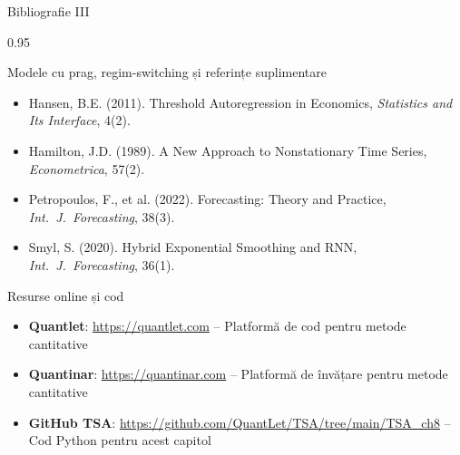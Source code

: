 \documentclass[9pt, aspectratio=169, t]{beamer}
\begin{document}
\begin{frame}{Bibliografie III}
    \begin{cminipage}{0.95\textwidth}
        \begin{block}{Modele cu prag, regim-switching și referințe suplimentare}
            {\footnotesize
            \begin{itemize}\setlength{\itemsep}{0pt}
                \item Hansen, B.E. (2011). Threshold Autoregression in Economics, \textit{Statistics and Its Interface}, 4(2).
                \item Hamilton, J.D. (1989). A New Approach to Nonstationary Time Series, \textit{Econometrica}, 57(2).
                \item Petropoulos, F., et al. (2022). Forecasting: Theory and Practice, \textit{Int.\ J.\ Forecasting}, 38(3).
                \item Smyl, S. (2020). Hybrid Exponential Smoothing and RNN, \textit{Int.\ J.\ Forecasting}, 36(1).
            \end{itemize}
            }
        \end{block}
        \vspace{-2mm}
        \begin{exampleblock}{Resurse online și cod}
            {\footnotesize
            \begin{itemize}\setlength{\itemsep}{0pt}
                \item \textbf{Quantlet}: \url{https://quantlet.com} -- Platformă de cod pentru metode cantitative
                \item \textbf{Quantinar}: \url{https://quantinar.com} -- Platformă de învățare pentru metode cantitative
                \item \textbf{GitHub TSA}: \url{https://github.com/QuantLet/TSA/tree/main/TSA_ch8} -- Cod Python pentru acest capitol
            \end{itemize}
            }
        \end{exampleblock}
    \end{cminipage}
\end{frame}
\end{document}
